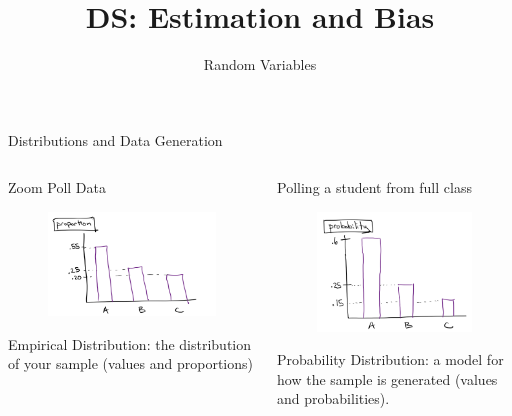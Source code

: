 \documentclass[aspectratio=169]{../latex_main/tntbeamer}  %
\title[Introduction]{DS: Estimation and Bias}
\subtitle{Random Variables}
\begin{document}
	
	\maketitle
	\begin{frame}{Distributions and Data Generation}
	    \begin{columns}
	        \begin{column}{.3\textwidth}
	        Zoom Poll Data\\
	           \begin{figure}
	               \includegraphics[scale=.5]{Bild10}
	           \end{figure}
	           Empirical Distribution: the distribution of your sample (values and proportions)
	        \end{column}
	        
	        \begin{column}{.3\textwidth}
	            Polling a student from full class
                \begin{figure}
                    \includegraphics[scale=.5]{Bild11}
                \end{figure}
                Probability Distribution: a model for how the sample is generated (values and probabilities).
	        \end{column}
	        

\end{columns}
\end{frame}
\end{document}

